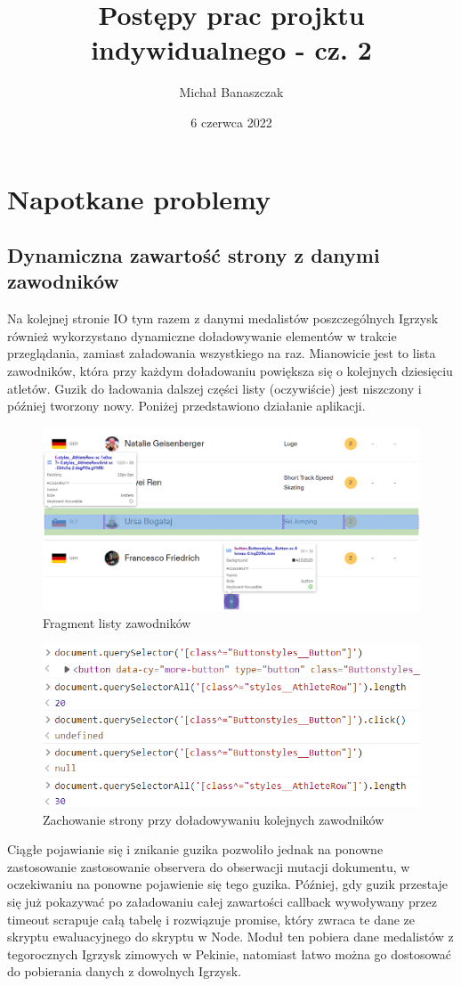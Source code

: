 \documentclass[a4paper,11pt]{article}
\title{Postępy prac projktu indywidualnego - cz. 2}
\author{Michał Banaszczak}
\date{6 czerwca 2022}
\begin{document}
\maketitle

\section{Napotkane problemy}

\subsection{Dynamiczna zawartość strony z danymi zawodników}
Na kolejnej stronie IO tym razem z danymi medalistów poszczególnych Igrzysk
również wykorzystano dynamiczne doładowywanie elementów w trakcie przeglądania,
zamiast załadowania wszystkiego na raz. Mianowicie jest to lista zawodników, która
przy każdym doładowaniu powiększa się o kolejnych dziesięciu atletów. Guzik do
ładowania dalszej części listy (oczywiście) jest niszczony i później tworzony nowy.
Poniżej przedstawiono działanie aplikacji.
\begin{figure}[h!t]
    \centering
    \includegraphics[width=\linewidth]{fragmentlisty.png}
    \caption{Fragment listy zawodników}
\end{figure}
\begin{figure}[h!t]
    \centering
    \includegraphics[width=0.65\linewidth]{zachowanielisty.png}
    \caption{Zachowanie strony przy doładowywaniu kolejnych zawodników}
\end{figure}
\newline
Ciągłe pojawianie się i znikanie guzika pozwoliło jednak na ponowne zastosowanie 
zastosowanie observera do obserwacji mutacji dokumentu, w oczekiwaniu na ponowne
pojawienie się tego guzika. Później, gdy guzik przestaje się już pokazywać po
załadowaniu całej zawartości callback wywoływany przez timeout scrapuje całą 
tabelę i rozwiązuje promise, który zwraca te dane ze skryptu ewaluacyjnego do
skryptu w Node. Moduł ten pobiera dane medalistów z tegorocznych Igrzysk zimowych
w Pekinie, natomiast łatwo można go dostosować do pobierania danych z dowolnych
Igrzysk. 
\end{document}
